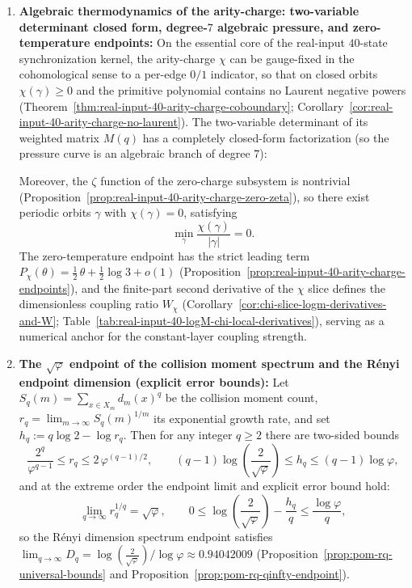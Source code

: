 \begin{theorem}
\begin{enumerate}
  \item \textbf{Algebraic thermodynamics of the arity-charge: two-variable determinant closed form, degree-\(7\) algebraic pressure, and zero-temperature endpoints:}
  On the essential core of the real-input \(40\)-state synchronization kernel, the arity-charge \(\chi\) can be gauge-fixed in the cohomological sense to a per-edge \(0/1\) indicator, so that on closed orbits \(\chi(\gamma)\ge 0\) and the primitive polynomial contains no Laurent negative powers (Theorem~\ref{thm:real-input-40-arity-charge-coboundary}; Corollary~\ref{cor:real-input-40-arity-charge-no-laurent}).
  The two-variable determinant of its weighted matrix \(M(q)\) has a completely closed-form factorization (so the pressure curve is an algebraic branch of degree \(7\)):
  
  Moreover, the \(\zeta\) function of the zero-charge subsystem is nontrivial (Proposition~\ref{prop:real-input-40-arity-charge-zero-zeta}), so there exist periodic orbits \(\gamma\) with \(\chi(\gamma)=0\), satisfying
  \[
  \min_{\gamma}\frac{\chi(\gamma)}{|\gamma|}=0.
  \]
  The zero-temperature endpoint has the strict leading term
  \(
  P_\chi(\theta)=\tfrac12\,\theta+\tfrac12\log 3+o(1)
  \)
  (Proposition~\ref{prop:real-input-40-arity-charge-endpoints}), and the finite-part second derivative of the \(\chi\) slice defines the dimensionless coupling ratio
  \(W_\chi\) (Corollary~\ref{cor:chi-slice-logm-derivatives-and-W}; Table~\ref{tab:real-input-40-logM-chi-local-derivatives}), serving as a numerical anchor for the constant-layer coupling strength.

  \item \textbf{The \texorpdfstring{$\sqrt{\varphi}$}{sqrt(phi)} endpoint of the collision moment spectrum and the R\'enyi endpoint dimension (explicit error bounds):}
  Let \(S_q(m)=\sum_{x\in X_m}d_m(x)^q\) be the collision moment count, \(r_q=\lim_{m\to\infty}S_q(m)^{1/m}\) its exponential growth rate, and set \(h_q:=q\log 2-\log r_q\).
  Then for any integer \(q\ge 2\) there are two-sided bounds
  \[
  \frac{2^q}{\varphi^{q-1}}\le r_q\le 2\,\varphi^{(q-1)/2},
  \qquad
  (q-1)\log\!\left(\frac{2}{\sqrt{\varphi}}\right)\le h_q\le (q-1)\log\varphi,
  \]
  and at the extreme order the endpoint limit and explicit error bound hold:
  \[
  \lim_{q\to\infty} r_q^{1/q}=\sqrt{\varphi},\qquad
  0\le \log\!\left(\frac{2}{\sqrt{\varphi}}\right)-\frac{h_q}{q}\le \frac{\log\varphi}{q},
  \]
  so the R\'enyi dimension spectrum endpoint satisfies
  \(
  \lim_{q\to\infty}D_q=\log\!\left(\frac{2}{\sqrt{\varphi}}\right)/\log\varphi\approx 0.94042009
  \)
  (Proposition~\ref{prop:pom-rq-universal-bounds} and Proposition~\ref{prop:pom-rq-qinfty-endpoint}).


\end{enumerate}
\end{theorem}
